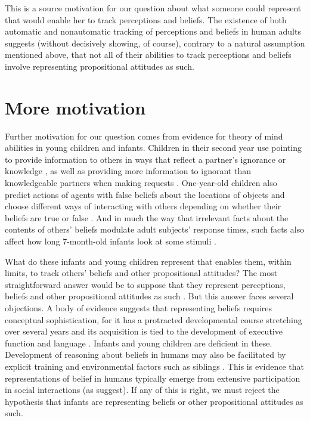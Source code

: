 \documentclass[12pt,\papersize]{extarticle}
\begin{document}
This is a source motivation for our question about what someone could represent that would enable her to track perceptions and beliefs.
The existence of both automatic and nonautomatic tracking of perceptions and beliefs in human adults 
suggests (without decisively showing, of course), 
contrary to a natural assumption mentioned above,
that not all of their abilities to track perceptions and beliefs involve representing propositional attitudes as such.

\section{More motivation}
Further motivation for our question comes from evidence for theory of mind abilities in young children and infants.
Children in their second year use pointing to provide information to others \citep[]{en_1093} in ways that reflect a partner’s ignorance or knowledge \citep[]{en_1699}, as well as providing more information to ignorant than knowledgeable partners when making requests \citep[]{en_1140}.  One-year-old children also predict actions of agents with false beliefs about the locations of objects \citep[]{en_1092, en_1208} and choose different ways of interacting with others depending on whether their beliefs are true or false \citep[]{en_1783,Knudsen:2011fk,southgate:2010fb}.  And in much the way that irrelevant facts about the contents of others’ beliefs modulate adult subjects’ response times, such facts also affect how long 7-month-old infants look at some stimuli \citep[]{kovacs_social_2010}.

What do these infants and young children represent that enables them, within limits, to track others’ beliefs and other propositional attitudes?   
The most straightforward answer would be to suppose that they represent perceptions, beliefs and other propositional attitudes as such \citep[e.g.][]{en_1138, en_1691}.  
But this answer faces several objections.  A body of evidence  suggests that representing beliefs requires conceptual sophistication, for it has a protracted developmental course stretching over several years \citep[]{en_87, en_89} and its acquisition is tied to the development of executive function \citep[]{en_410, en_1130} and language \citep[]{en_1209}.  Infants and young children are deficient in these.  
Development of reasoning about beliefs in humans may also be facilitated by explicit training \citep[]{en_85} and environmental factors such as siblings \citep[]{en_507, en_1299}.  
This is evidence that representations of belief in humans typically emerge from extensive participation in social interactions (as \citealp{en_1300} suggest).  
If any of this is right, we must reject the hypothesis that infants are representing beliefs or other propositional attitudes as such.
\end{document}
